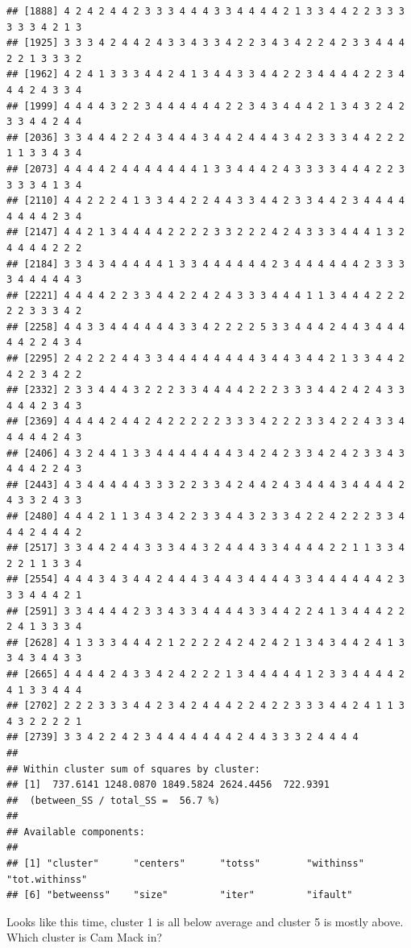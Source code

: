 \documentclass[]{book}
\newenvironment{Shaded}{\begin{snugshade}}{\end{snugshade}}
\newcommand{\KeywordTok}[1]{\textcolor[rgb]{0.13,0.29,0.53}{\textbf{#1}}}
\newcommand{\NormalTok}[1]{#1}
\newcommand{\OperatorTok}[1]{\textcolor[rgb]{0.81,0.36,0.00}{\textbf{#1}}}
\newcommand{\StringTok}[1]{\textcolor[rgb]{0.31,0.60,0.02}{#1}}
\begin{document}
\begin{verbatim}
## [1888] 4 2 4 2 4 4 2 3 3 3 4 4 4 3 3 4 4 4 4 2 1 3 3 4 4 2 2 3 3 3 3 3 3 4 2 1 3
## [1925] 3 3 3 4 2 4 4 2 4 3 3 4 3 3 4 2 2 3 4 3 4 2 2 4 2 3 3 4 4 4 2 2 1 3 3 3 2
## [1962] 4 2 4 1 3 3 3 4 4 2 4 1 3 4 4 3 3 4 4 2 2 3 4 4 4 4 2 2 3 4 4 4 2 4 3 3 4
## [1999] 4 4 4 4 3 2 2 3 4 4 4 4 4 4 2 2 3 4 3 4 4 4 2 1 3 4 3 2 4 2 3 3 4 4 2 4 4
## [2036] 3 3 4 4 4 2 2 4 3 4 4 4 3 4 4 2 4 4 4 3 4 2 3 3 3 4 4 2 2 2 1 1 3 3 4 3 4
## [2073] 4 4 4 4 2 4 4 4 4 4 4 4 1 3 3 4 4 4 2 4 3 3 3 3 4 4 4 2 2 3 3 3 3 4 1 3 4
## [2110] 4 4 2 2 2 4 1 3 3 4 4 2 2 4 4 3 3 4 4 2 3 3 4 4 2 3 4 4 4 4 4 4 4 4 2 3 4
## [2147] 4 4 2 1 3 4 4 4 4 2 2 2 2 3 3 2 2 2 4 2 4 3 3 3 4 4 4 1 3 2 4 4 4 4 2 2 2
## [2184] 3 3 4 3 4 4 4 4 4 1 3 3 4 4 4 4 4 4 2 3 4 4 4 4 4 4 2 3 3 3 3 4 4 4 4 4 3
## [2221] 4 4 4 4 2 2 3 3 4 4 2 2 4 2 4 3 3 3 4 4 4 1 1 3 4 4 4 2 2 2 2 2 3 3 3 4 2
## [2258] 4 4 3 3 4 4 4 4 4 4 3 3 4 2 2 2 2 5 3 3 4 4 4 2 4 4 3 4 4 4 4 4 2 2 4 3 4
## [2295] 2 4 2 2 2 4 4 3 3 4 4 4 4 4 4 4 4 3 4 4 3 4 4 2 1 3 3 4 4 2 4 2 2 3 4 2 2
## [2332] 2 3 3 4 4 4 3 2 2 2 3 3 4 4 4 4 2 2 2 3 3 3 4 4 2 4 2 4 3 3 4 4 4 2 3 4 3
## [2369] 4 4 4 4 2 4 4 2 4 2 2 2 2 2 3 3 3 4 2 2 2 3 3 4 2 2 4 3 3 4 4 4 4 4 2 4 3
## [2406] 4 3 2 4 4 1 3 3 4 4 4 4 4 4 4 3 4 2 4 2 3 3 4 2 4 2 3 3 4 3 4 4 4 2 2 4 3
## [2443] 4 3 4 4 4 4 4 3 3 3 2 2 3 3 4 2 4 4 2 4 3 4 4 4 3 4 4 4 4 2 4 3 3 2 4 3 3
## [2480] 4 4 4 2 1 1 3 4 3 4 2 2 3 3 4 4 3 2 3 3 4 2 2 4 2 2 2 3 3 4 4 4 2 4 4 4 2
## [2517] 3 3 4 4 2 4 4 3 3 3 4 4 3 2 4 4 4 3 3 4 4 4 4 2 2 1 1 3 3 4 2 2 1 1 3 3 4
## [2554] 4 4 4 3 4 3 4 4 2 4 4 4 3 4 4 3 4 4 4 4 3 3 4 4 4 4 4 4 2 3 3 3 4 4 4 2 1
## [2591] 3 3 4 4 4 4 2 3 3 4 3 3 4 4 4 4 3 3 4 4 2 2 4 1 3 4 4 4 2 2 2 4 1 3 3 3 4
## [2628] 4 1 3 3 3 4 4 4 2 1 2 2 2 2 4 2 4 2 4 2 1 3 4 3 4 4 2 4 1 3 3 4 3 4 4 3 3
## [2665] 4 4 4 4 2 4 3 3 4 2 4 2 2 2 1 3 4 4 4 4 4 1 2 3 3 4 4 4 4 2 4 1 3 3 4 4 4
## [2702] 2 2 2 3 3 3 4 4 2 3 4 2 4 4 4 2 2 4 2 2 3 3 3 4 4 2 4 1 1 3 4 3 2 2 2 2 1
## [2739] 3 3 4 2 2 4 2 3 4 4 4 4 4 4 4 2 4 4 3 3 3 2 4 4 4 4
## 
## Within cluster sum of squares by cluster:
## [1]  737.6141 1248.0870 1849.5824 2624.4456  722.9391
##  (between_SS / total_SS =  56.7 %)
## 
## Available components:
## 
## [1] "cluster"      "centers"      "totss"        "withinss"     "tot.withinss"
## [6] "betweenss"    "size"         "iter"         "ifault"
\end{verbatim}

Looks like this time, cluster 1 is all below average and cluster 5 is mostly above. Which cluster is Cam Mack in?

\begin{Shaded}
\end{Shaded}
\end{document}

